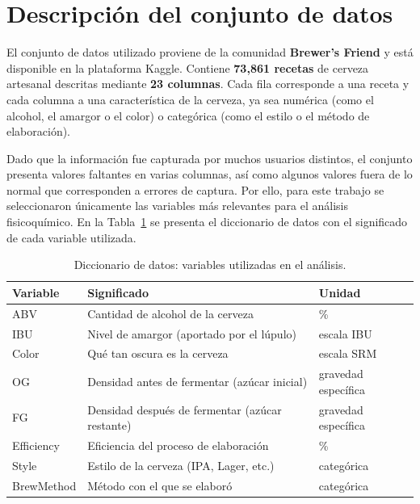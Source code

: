 \documentclass[11pt]{article}
\begin{document}
\section{Descripción del conjunto de datos}

El conjunto de datos utilizado proviene de la comunidad \textbf{Brewer's Friend} y
está disponible en la plataforma Kaggle. Contiene \textbf{73{,}861 recetas} de
cerveza artesanal descritas mediante \textbf{23 columnas}. Cada fila corresponde a
una receta y cada columna a una característica de la cerveza, ya sea numérica (como
el alcohol, el amargor o el color) o categórica (como el estilo o el método de
elaboración).

Dado que la información fue capturada por muchos usuarios distintos, el conjunto
presenta valores faltantes en varias columnas, así como algunos valores fuera de lo
normal que corresponden a errores de captura. Por ello, para este trabajo se
seleccionaron únicamente las variables más relevantes para el análisis
fisicoquímico. En la Tabla~\ref{tab:diccionario} se presenta el diccionario de
datos con el significado de cada variable utilizada.

\begin{table}[H]
    \centering
    \caption{Diccionario de datos: variables utilizadas en el análisis.}
    \label{tab:diccionario}
    \begin{tabular}{lll}
        \toprule
        \textbf{Variable} & \textbf{Significado} & \textbf{Unidad} \\
        \midrule
        ABV        & Cantidad de alcohol de la cerveza               & \%                  \\
        IBU        & Nivel de amargor (aportado por el lúpulo)       & escala IBU          \\
        Color      & Qué tan oscura es la cerveza                    & escala SRM          \\
        OG         & Densidad antes de fermentar (azúcar inicial)    & gravedad específica \\
        FG         & Densidad después de fermentar (azúcar restante) & gravedad específica \\
        Efficiency & Eficiencia del proceso de elaboración           & \%                  \\
        Style      & Estilo de la cerveza (IPA, Lager, etc.)         & categórica          \\
        BrewMethod & Método con el que se elaboró                    & categórica          \\
        \bottomrule
    \end{tabular}
\end{table}
\end{document}
